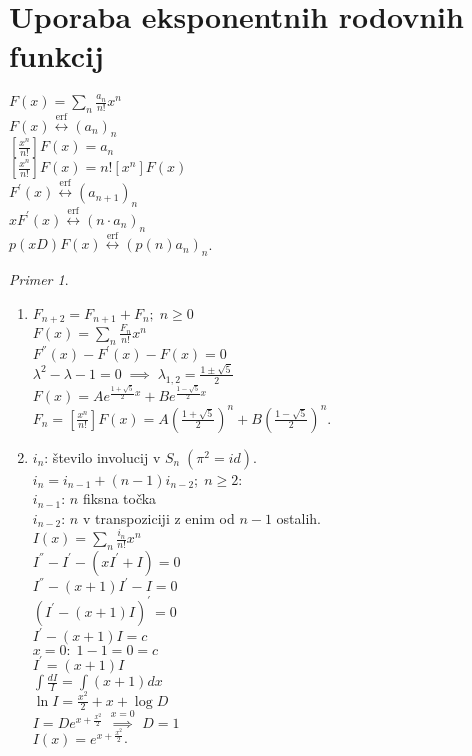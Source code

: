 \documentclass[a4paper, 12pt]{book}
\theoremstyle{definition}
\theoremstyle{remark}
\newtheorem*{ex}{Primer}
\begin{document}
\section{Uporaba eksponentnih rodovnih funkcij}

$F(x) = \sum_n \frac{a_n}{n!} x^n$ \\
$F(x) \stackrel{\text{erf}}{\longleftrightarrow} (a_n)_n$ \\
$\left[\frac{x^n}{n!}\right] F(x) = a_n$ \\
$\left[\frac{x^n}{n!}\right] F(x) = n! [x^n] F(x)$ \\
$F^{'}(x) \stackrel{\text{erf}}{\longleftrightarrow} (a_{n+1})_n$ \\
$x F^{'}(x) \stackrel{\text{erf}}{\longleftrightarrow} (n \cdot a_n)_n$ \\
$p(xD) F(x) \stackrel{\text{erf}}{\longleftrightarrow} (p(n) a_n)_n$.
\begin{ex} \text{} \\
  \begin{enumerate}[label=(\arabic{*})]
    \item $F_{n+2} = F_{n+1} + F_n; \; n \geq 0$ \\
      $F(x) = \sum_n \frac{F_n}{n!} x^n$ \\
      $F^{''}(x) - F^{'}(x) - F(x) = 0$ \\
      $\lambda^2 - \lambda - 1 = 0 \; \implies \; \lambda_{1,2} = \frac{1 \pm \sqrt{5}}{2}$ \\
      $F(x) = A e^{\frac{1+\sqrt{5}}{2} x} + B e^{\frac{1-\sqrt{5}}{2} x}$ \\
      $F_n = \left[\frac{x^n}{n!}\right] F(x) =
        A \left(\frac{1+\sqrt{5}}{2}\right)^n + B \left(\frac{1-\sqrt{5}}{2}\right)^n$.
    \item $i_n$: število involucij v $S_n \; (\pi^2 = id)$. \\
      $i_n = i_{n-1} + (n-1) i_{n-2}; \; n \geq 2$: \\
      $i_{n-1}$: $n$ fiksna točka \\
      $i_{n-2}$: $n$ v transpoziciji z enim od $n-1$ ostalih. \\
      $I(x) = \sum_{n} \frac{i_n}{n!} x^n$ \\
      $I^{''} - I^{'} - (xI^{'} + I) = 0$ \\
      $I^{''} - (x+1)I^{'} - I = 0$ \\
      $(I^{'} - (x+1)I)^{'} = 0$ \\
      $I^{'} - (x+1)I = c$ \\
      $x=0:\; 1 - 1 = 0 = c$ \\
      $I^{'} = (x+1)I$ \\
      $\int \frac{dI}{I} = \int (x+1) dx$ \\
      $\ln I = \frac{x^2}{2} + x + \log D$ \\
      $I = D e^{x + \frac{x^2}{2}} \; \stackrel{x=0}{\implies} \; D = 1$\\
      $I(x) = e^{x + \frac{x^2}{2}}$.
  \end{enumerate}
\end{ex}
\end{document}
